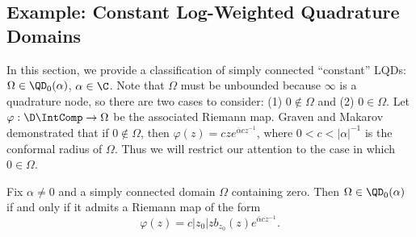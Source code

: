 \documentclass{article}
\numberwithin{equation}{section}
\begin{document}

\subsection{Example: Constant Log-Weighted Quadrature Domains}\label{subsec:ConstantLQDExample}
In this section, we provide a classification of simply connected ``constant'' LQDs: $\Omega\in\QD_0(\alpha)$, $\alpha\in\C$. Note that $\Omega$ must be unbounded because $\infty$ is a quadrature node, so there are two cases to consider: (1) $0\notin\Omega$ and (2) $0\in\Omega$. Let $\varphi:\D\IntComp\rightarrow\Omega$ be the associated Riemann map. Graven and Makarov \cite{GravenMakarov2025} demonstrated that if $0\notin\Omega$, then $\varphi(z)=cze^{\overline{\alpha}cz^{-1}}$, where $0<c<|\alpha|^{-1}$ is the conformal radius of $\Omega$. Thus we will restrict our attention to the case in which $0\in\Omega$. 

\begin{theorem}
Fix $\alpha\neq0$ and a simply connected domain $\Omega$ containing zero. Then $\Omega\in\QD_0(\alpha)$ if and only if it admits a Riemann map of the form
\begin{equation}\label{eqn:ZConstantLQDRiemannMap}
    \varphi(z)=c|z_0|zb_{z_0}(z)e^{\overline{\alpha}cz^{-1}}.
\end{equation}
\end{theorem}
\end{document}
